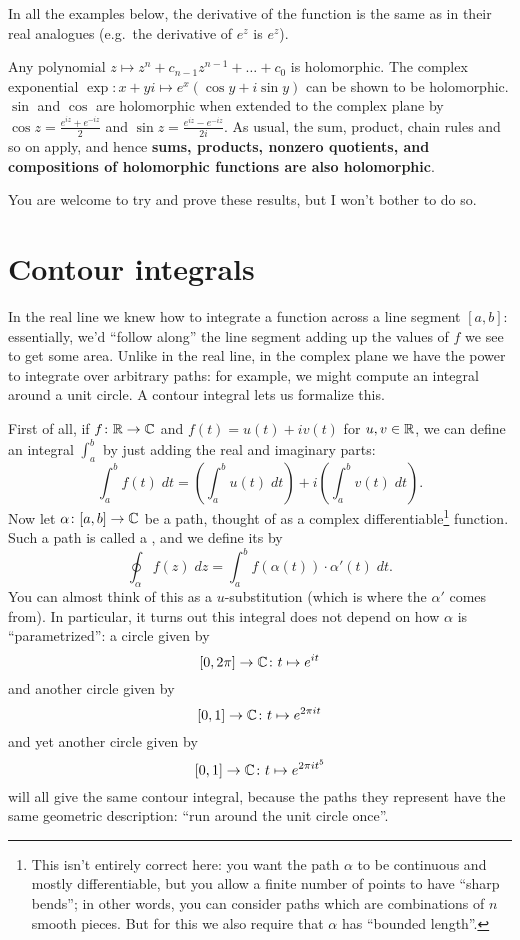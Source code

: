 \begin{example}
	In all the examples below, the derivative of the function
	is the same as in their real analogues
	(e.g.\ the derivative of $e^z$ is $e^z$).
	\begin{enumerate}[(a)]
		\ii Any polynomial $z \mapsto z^n + c_{n-1} z^{n-1} + \dots + c_0$ is holomorphic.
		\ii The complex exponential $\exp \colon x+yi \mapsto e^x (\cos y + i \sin y)$
		can be shown to be holomorphic.
		\ii $\sin$ and $\cos$ are holomorphic when extended
		to the complex plane by $\cos z = \frac{e^{iz}+e^{-iz}}{2}$
		and $\sin z = \frac{e^{iz}-e^{-iz}}{2i}$.
		\ii As usual, the sum, product, chain rules and so on apply,
		and hence \textbf{sums, products, nonzero quotients,
		and compositions of holomorphic functions are also holomorphic}.
	\end{enumerate}
\end{example}
You are welcome to try and prove these results, but I won't bother to do so.

\section{Contour integrals}
In the real line we knew how to integrate a function across a line segment $[a,b]$:
essentially, we'd ``follow along'' the line segment adding up the values of $f$ we see
to get some area.
Unlike in the real line, in the complex plane we have the power to integrate
over arbitrary paths: for example, we might compute an integral around a unit circle.
A contour integral lets us formalize this.

First of all, if $f \colon \mathbb R \to \mathbb C$ and $f(t) = u(t) + iv(t)$ for $u,v \in \mathbb R$,
we can define an integral $\int_a^b$ by just adding the real and imaginary parts:
\[ \int_a^b f(t) \; dt
	= \left( \int_a^b u(t) \; dt \right)
	+ i \left( \int_a^b v(t) \; dt \right). \]
Now let $\alpha \colon [a,b] \to \mathbb C$ be a path, thought of as
a complex differentiable\footnote{This isn't entirely correct here:
	you want the path $\alpha$ to be continuous and mostly differentiable,
	but you allow a finite number of points to have ``sharp bends''; in other words,
	you can consider paths which are combinations of $n$ smooth pieces.
	But for this we also require that $\alpha$ has ``bounded length''.} function.
Such a path is called a ,
and we define its  by
\[
	\oint_\alpha f(z) \; dz
	= \int_a^b f(\alpha(t)) \cdot \alpha'(t) \; dt.
\]
You can almost think of this as a $u$-substitution (which is where the $\alpha'$ comes from).
In particular, it turns out this integral does not depend on how $\alpha$ is ``parametrized'':
a circle given by \[ [0,2\pi] \to \mathbb C \colon t \mapsto e^{it} \]
and another circle given by \[ [0,1] \to \mathbb C \colon t \mapsto e^{2\pi i t} \]
and yet another circle given by \[ [0,1] \to \mathbb C \colon t \mapsto e^{2 \pi i t^5} \]
will all give the same contour integral, because the paths they represent have the same
geometric description: ``run around the unit circle once''.


